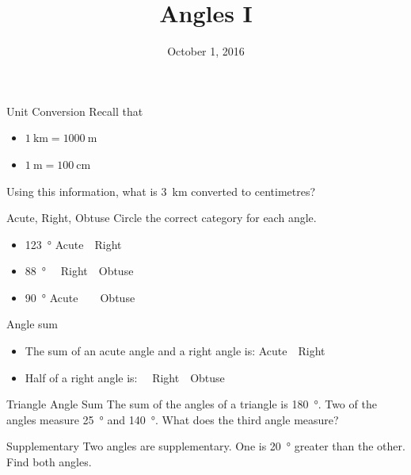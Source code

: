 \documentclass[14pt,letterpaper]{article}
\title{Angles I}
\date{October 1, 2016}
\begin{document}
\HomeworkTitle

\thispagestyle{empty}

\begin{problem}{Unit Conversion}
  Recall that \begin{itemize}
    \item \(\SI{1}{\kilo\metre}=\SI{1000}{\metre}\)
    \item \(\SI{1}{\metre}=\SI{100}{\centi\metre}\)
  \end{itemize}
  Using this information, what is \SI{3}{\kilo\metre} converted to centimetres?
  \hfill {}
\end{problem}

\begin{problem}{Acute, Right, Obtuse}
 Circle the correct category for each angle.

 \begin{itemize}
  \item \SI{123}{\degree} \hfill Acute~~Right~~
  \item \SI{88}{\degree} \hfill {}~~Right~~Obtuse
  \item \SI{90}{\degree} \hfill Acute~~~~Obtuse
 \end{itemize}
\end{problem}

\begin{problem}{Angle sum}
 \begin{itemize}
  \item The sum of an acute angle and a right angle is:
        \hfill Acute~~Right~~
  \item Half of a right angle is:
        \hfill {}~~Right~~Obtuse
 \end{itemize}
\end{problem}

\begin{problem}{Triangle Angle Sum}
 The sum of the angles of a triangle is \SI{180}{\degree}. Two of the angles
 measure \SI{25}{\degree} and \SI{140}{\degree}. What does the third angle
 measure? 
\end{problem}

\begin{problem}{Supplementary}
 Two angles are supplementary. One is \SI{20}{\degree} greater than the other.
 Find both angles. 
\end{problem}
\end{document}
